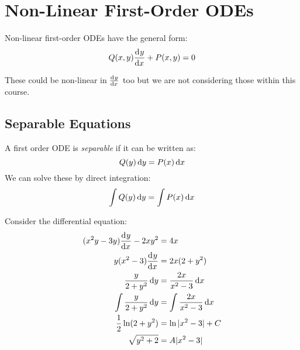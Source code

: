 \documentclass[../main.tex]{subfiles}
\begin{document}
\section{Non-Linear First-Order ODEs}
Non-linear first-order ODEs have the general form:
\begin{equation}
  \label{nonLinearGeneral}
  Q(x, y)\deriv{y}{x} + P(x, y) = 0
\end{equation}
\begin{remark}
  These could be non-linear in $\deriv{y}{x}$ too but we are not considering those within this course.
\end{remark}
\subsection{Separable Equations}
A first order ODE is \textit{separable} if it can be written as:
\[
  Q(y) \,\mathrm{d} y = P(x) \,\mathrm{d} x
\]
We can solve these by direct integration:
\[
  \int Q(y) \,\mathrm{d} y = \int P(x) \,\mathrm{d} x
\]
\begin{example}
  Consider the differential equation:
  \begin{align*}
    (x^2y - 3y)\deriv{y}{x} - 2xy^2 &= 4x \\
    y(x^2 - 3)\deriv{y}{x} &= 2x(2 + y^2) \\
    \frac{y}{2 + y^2} \d{y} &= \frac{2x}{x^2 -3} \d{x} \\
    \int \frac{y}{2 + y^2} \d{y} &= \int \frac{2x}{x^2 - 3} \d{x} \\
    \frac{1}{2}\ln(2 + y^2) &= \ln|x^2 - 3| + C \\
    \sqrt{y^2 + 2} &= A|x^2 - 3|
  \end{align*}
\end{example}
\end{document}
